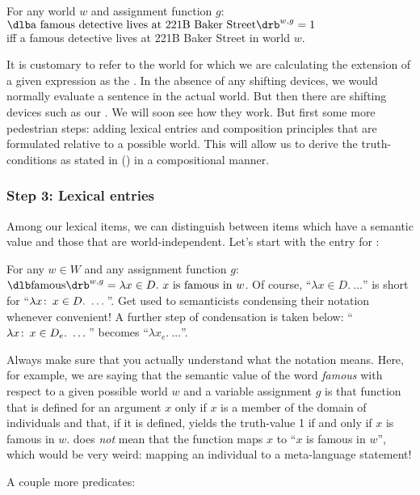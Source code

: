 \ex For any world \(w\) and assignment function \(g\):\\
$\svt{a famous detective lives at 221B Baker Street}^{w,g} = 1$\\
iff a famous detective lives at 221B Baker Street in world $w$. \xe

It is customary to refer to the world for which we are calculating the extension
of a given expression as the . In the absence of any
shifting devices, we would normally evaluate a sentence in the actual world. But
then there are shifting devices such as our . We will soon see how they work. But first some more pedestrian steps:
adding lexical entries and composition principles that are formulated relative
to a possible world. This will allow us to derive the truth-conditions as stated
in (\lastx) in a compositional manner.

\subsubsection{Step 3: Lexical entries} \label{sec:lexical-entries}

Among our lexical items, we can distinguish between items which have a
 semantic value and those that are world-independent.
Let's start with the entry for :

\ex For any $w \in W$ and any assignment function $g$:\\
$\svt{famous}^{w,g} = \lambda x \in D.\ x \mbox{ is famous in }
w$.
\xe
%
Of course, ``$\lambda x \in D.\ \dots$'' is short for
``$\lambda x\co x \in D.\ \dots$''. Get used to semanticists condensing their
notation whenever convenient! A further step of condensation is taken below:
``$\lambda x\co x \in D_e.\ \dots$'' becomes ``$\lambda x_e.\ \dots$''.

Always make sure that you actually understand what the notation means. Here, for
example, we are saying that the semantic value of the word \emph{famous} with
respect to a given possible world $w$ and a variable assignment $g$ is that
function that is defined for an argument $x$ only if $x$ is a member of the
domain of individuals and that, if it is defined, yields the truth-value 1 if
and only if $x$ is famous in $w$. \Last does \emph{not} mean that the
function maps $x$ to ``$x$ is famous in $w$'', which would be very weird:
mapping an individual to a meta-language statement!

%
A couple more predicates:

